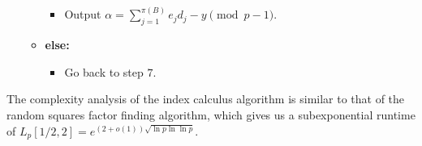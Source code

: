 \begin{algo}
\begin{enumerate}[1.]
\begin{itemize}
\begin{itemize}[$\circ$]
                                    \item Output $\alpha = \sum_{j=1}^{\pi(B)} e_j d_j - y \pmod{p-1}$. 
                              \end{itemize}
                        \item {\bf else:}
                              \begin{itemize}[$\circ$]
                                    \item Go back to step $7$. 
                              \end{itemize}
                  \end{itemize}
      \end{enumerate}
\end{algo}

The complexity analysis of the index calculus algorithm is similar to that of 
the random squares factor finding algorithm, which gives us a subexponential 
runtime of $L_p[1/2, 2] = e^{(2+o(1))\sqrt{\ln p \ln\ln p}}$. 